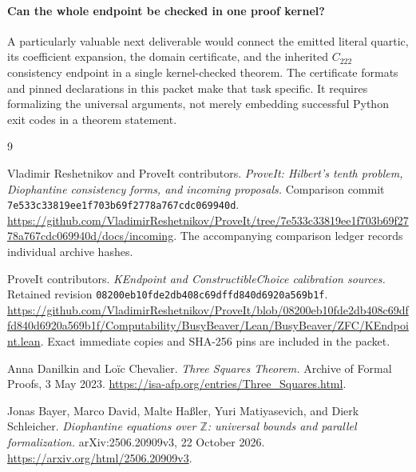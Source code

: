 \documentclass[11pt,a4paper]{article}
\theoremstyle{definition}
\begin{document}
\paragraph{Can the whole endpoint be checked in one proof kernel?}
A particularly valuable next deliverable would connect the emitted
literal quartic, its coefficient expansion, the domain certificate, and
the inherited $C_{222}$ consistency endpoint in a single kernel-checked
theorem. The certificate formats and pinned declarations in this packet
make that task specific. It requires formalizing the universal arguments,
not merely embedding successful Python exit codes in a theorem statement.

\begin{thebibliography}{9}
\raggedright

Vladimir Reshetnikov and ProveIt contributors.
\emph{ProveIt: Hilbert's tenth problem, Diophantine consistency forms,
and incoming proposals.}
Comparison commit \texttt{7e533c33819ee1f703b69f2778a767cdc069940d}.
\url{https://github.com/VladimirReshetnikov/ProveIt/tree/7e533c33819ee1f703b69f2778a767cdc069940d/docs/incoming}.
The accompanying comparison ledger records individual archive hashes.

ProveIt contributors.
\emph{KEndpoint and ConstructibleChoice calibration sources.}
Retained revision \texttt{08200eb10fde2db408c69dffd840d6920a569b1f}.
\url{https://github.com/VladimirReshetnikov/ProveIt/blob/08200eb10fde2db408c69dffd840d6920a569b1f/Computability/BusyBeaver/Lean/BusyBeaver/ZFC/KEndpoint.lean}.
Exact immediate copies and SHA-256 pins are included in the packet.

Anna Danilkin and Lo\"ic Chevalier.
\emph{Three Squares Theorem.}
Archive of Formal Proofs, 3 May 2023.
\url{https://isa-afp.org/entries/Three_Squares.html}.

Jonas Bayer, Marco David, Malte Ha\ss ler, Yuri Matiyasevich, and
Dierk Schleicher.
\emph{Diophantine equations over $\mathbb Z$: universal bounds and
parallel formalization.}
arXiv:2506.20909v3, 22 October 2026.
\url{https://arxiv.org/html/2506.20909v3}.

\end{thebibliography}
\end{document}
